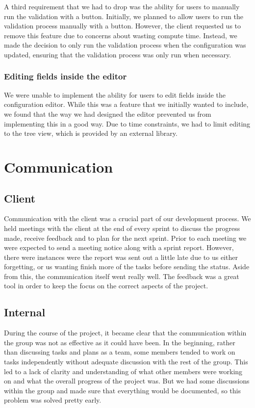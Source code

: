 A third requirement that we had to drop was the ability for users to manually run the validation with a button. Initially, we planned to allow users to run the validation process manually with a button. However, the client requested us to remove this feature due to concerns about wasting compute time. Instead, we made the decision to only run the validation process when the configuration was updated, ensuring that the validation process was only run when necessary. 

\subsubsection{Editing fields inside the editor}

We were unable to implement the ability for users to edit fields inside the configuration editor. While this was a feature that we initially wanted to include, we found that the way we had designed the editor prevented us from implementing this in a good way. Due to time constraints, we had to limit editing to the tree view, which is provided by an external library. 

\section{Communication}

\subsection{Client}
Communication with the client was a crucial part of our development process. We held meetings with the client at the end of every sprint to discuss the progress made, receive feedback and to plan for the next sprint. Prior to each meeting we were expected to send a meeting notice along with a sprint report. However, there were instances were the report was sent out a little late due to us either forgetting, or us wanting finish more of the tasks before sending the status.
Aside from this, the communication itself went really well. The feedback was a great tool in order to keep the focus on the correct aspects of the project.

\subsection{Internal}

During the course of the project, it became clear that the communication within the group was not as effective as it could have been. In the beginning, rather than discussing tasks and plans as a team, some members tended to work on tasks independently without adequate discussion with the rest of the group. This led to a lack of clarity and understanding of what other members were working on and what the overall progress of the project was. But we had some discussions within the group and made sure that everything would be documented, so this problem was solved pretty early. \\


